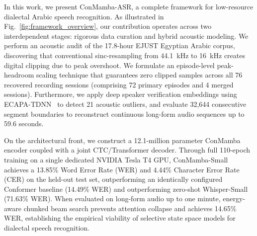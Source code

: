 \documentclass[journal]{IEEEtran}
\begin{document}
In this work, we present ConMamba-ASR, a complete framework for low-resource dialectal Arabic speech recognition. As illustrated in Fig.~\ref{fig:framework_overview}, our contribution operates across two interdependent stages: rigorous data curation and hybrid acoustic modeling. We perform an acoustic audit of the 17.8-hour EJUST Egyptian Arabic corpus, discovering that conventional sinc-resampling from 44.1~kHz to 16~kHz creates digital clipping due to peak overshoot. We formulate an episode-level peak-headroom scaling technique that guarantees zero clipped samples across all 76 recovered recording sessions (comprising 72 primary episodes and 4 merged sessions). Furthermore, we apply deep speaker verification embeddings using ECAPA-TDNN~\cite{desplanques2020ecapa} to detect 21 acoustic outliers, and evaluate 32,644 consecutive segment boundaries to reconstruct continuous long-form audio sequences up to 59.6 seconds.

On the architectural front, we construct a 12.1-million parameter ConMamba encoder coupled with a joint CTC/Transformer decoder. Through full 110-epoch training on a single dedicated NVIDIA Tesla T4 GPU, ConMamba-Small achieves a 13.85\% Word Error Rate (WER) and 4.44\% Character Error Rate (CER) on the held-out test set, outperforming an identically configured Conformer baseline (14.49\% WER) and outperforming zero-shot Whisper-Small (71.63\% WER). When evaluated on long-form audio up to one minute, energy-aware chunked beam search prevents attention collapse and achieves 14.65\% WER, establishing the empirical viability of selective state space models for dialectal speech recognition.
\end{document}
